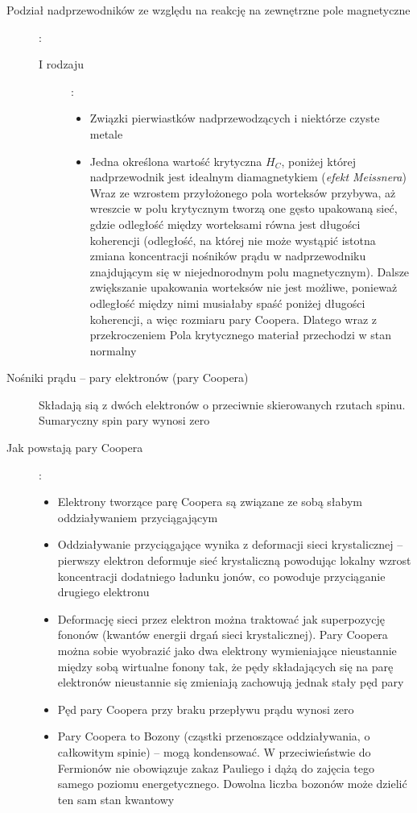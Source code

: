 \documentclass[a4paper,11pt]{article}
\begin{document}
\begin{description}
\item[Podział nadprzewodników ze względu na reakcję na zewnętrzne pole magnetyczne]:
  \begin{description}
  \item [I rodzaju]:
    \begin{itemize}
    \item Związki pierwiastków nadprzewodzących i niektórze czyste metale
    \item Jedna określona wartość krytyczna $H_C$, poniżej której nadprzewodnik jest idealnym diamagnetykiem (\emph{efekt Meissnera})\\
      Wraz ze wzrostem przyłożonego pola worteksów przybywa, aż wreszcie w polu krytycznym tworzą one gęsto upakowaną sieć, gdzie odległość między worteksami równa jest długości koherencji (odległość, na której nie może wystąpić istotna zmiana koncentracji nośników prądu w nadprzewodniku znajdującym się w niejednorodnym polu magnetycznym). Dalsze zwiększanie upakowania worteksów nie jest możliwe, ponieważ odległość między nimi musiałaby spaść poniżej długości koherencji, a więc rozmiaru pary Coopera. Dlatego wraz z przekroczeniem Pola krytycznego materiał przechodzi w stan normalny
    \end{itemize}
  \end{description}
\item[Nośniki prądu -- pary elektronów (pary Coopera)] Składają sią z dwóch elektronów o przeciwnie skierowanych rzutach spinu. Sumaryczny spin pary wynosi zero
\item[Jak powstają pary Coopera]:
  \begin{itemize}
  \item Elektrony tworzące parę Coopera są związane ze sobą słabym oddziaływaniem przyciągającym
  \item Oddziaływanie przyciągające wynika z deformacji sieci krystalicznej -- pierwszy elektron deformuje sieć krystaliczną powodując lokalny wzrost koncentracji dodatniego ładunku jonów, co powoduje przyciąganie drugiego elektronu
  \item Deformację sieci przez elektron można traktować jak superpozycję fononów (kwantów energii drgań sieci krystalicznej). Pary Coopera można sobie wyobrazić jako dwa elektrony wymieniające nieustannie między sobą wirtualne fonony tak, że pędy składających się na parę elektronów nieustannie się zmieniają zachowują jednak stały pęd pary
  \item Pęd pary Coopera przy braku przepływu prądu wynosi zero
  \item Pary Coopera to Bozony (cząstki przenoszące oddziaływania, o całkowitym spinie) -- mogą kondensować. W przeciwieństwie do Fermionów nie obowiązuje zakaz Pauliego i dążą do zajęcia tego samego poziomu  energetycznego. Dowolna liczba bozonów może dzielić ten sam stan kwantowy

\end{itemize}
\end{description}
\end{document}
